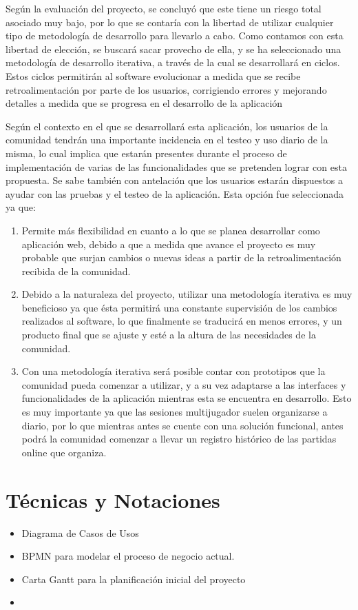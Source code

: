 Según la evaluación del proyecto, se concluyó que este tiene un riesgo total asociado muy bajo, por lo que se contaría con la libertad de utilizar cualquier tipo de metodología de desarrollo para llevarlo a cabo. Como contamos con esta libertad de elección, se buscará sacar provecho de ella, y se ha seleccionado una metodología de desarrollo iterativa, a través de la cual se desarrollará en ciclos. Estos ciclos permitirán al software evolucionar a medida que se recibe retroalimentación por parte de los usuarios, corrigiendo errores y mejorando detalles a medida que se progresa en el desarrollo de la aplicación

Según el contexto en el que se desarrollará esta aplicación, los usuarios de la comunidad tendrán una importante incidencia en el testeo y uso diario de la misma, lo cual implica que estarán presentes durante el proceso de implementación de varias de las funcionalidades que se pretenden lograr con esta propuesta. Se sabe también con antelación que los usuarios estarán dispuestos a ayudar con las pruebas y el testeo de la aplicación. Esta opción fue seleccionada ya que:

\begin{enumerate}
	\item Permite más flexibilidad en cuanto a lo que se planea desarrollar como aplicación web, debido a que a medida que avance el proyecto es muy probable que surjan cambios o nuevas ideas a partir de la retroalimentación recibida de la comunidad.
	\item Debido a la naturaleza del proyecto, utilizar una metodología iterativa es muy beneficioso ya que ésta permitirá una constante supervisión de los cambios realizados al software, lo que finalmente se traducirá en menos errores, y un producto final que se ajuste y esté a la altura de las necesidades de la comunidad.
	\item Con una metodología iterativa será posible contar con prototipos que la comunidad pueda comenzar a utilizar, y a su vez adaptarse a las interfaces y funcionalidades de la aplicación mientras esta se encuentra en desarrollo. Esto es muy importante ya que las sesiones multijugador suelen organizarse a diario, por lo que mientras antes se cuente con una solución funcional, antes podrá la comunidad comenzar a llevar un registro histórico de las partidas online que organiza.
\end{enumerate}

\section{Técnicas y Notaciones}
\begin{itemize}
	\item Diagrama de Casos de Usos
	\item BPMN para modelar el proceso de negocio actual.
	\item Carta Gantt para la planificación inicial del proyecto
	\item 
\end{itemize}

